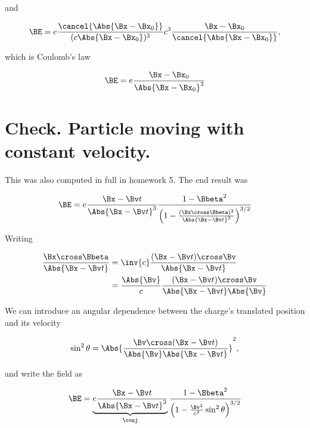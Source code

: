and

\begin{equation}\label{eqn:relativisticElectrodynamicsL19:140}
\BE = e \frac{\cancel{ \Abs{\Bx - \Bx_0}} }{ (c \Abs{\Bx - \Bx_0})^3 } c^3 \frac{\Bx - \Bx_0}{\cancel{\Abs{\Bx - \Bx_0}}},
\end{equation}

which is Coulomb's law

\begin{equation}\label{eqn:relativisticElectrodynamicsL19:160}
\BE = e \frac{\Bx - \Bx_0}{\Abs{\Bx - \Bx_0}^3}
\end{equation}

\section{Check.  Particle moving with constant velocity.}

This was also computed in full in homework 5.  The end result was

\begin{equation}\label{eqn:relativisticElectrodynamicsL19:180}
\BE =
e 
\frac{\Bx - \Bv t}{\Abs{\Bx - \Bv t}^3}
\frac{1 -\Bbeta^2}{ \left(1 - \frac{(\Bx \cross \Bbeta)^2}{\Abs{\Bx - \Bv t}^2} \right)^{3/2} }
\end{equation}

Writing

\begin{align*}
\frac{\Bx \cross \Bbeta}{\Abs{\Bx - \Bv t}}
&=
\inv{c} \frac{(\Bx - \Bv t) \cross \Bv}{\Abs{\Bx - \Bv t}}  \\
&=
\frac{\Abs{\Bv}}{c} \frac{(\Bx - \Bv t) \cross \Bv}{\Abs{\Bx - \Bv t} \Abs{\Bv}}  
\end{align*}

We can introduce an angular dependence between the charge's translated position and its velocity

\begin{equation}\label{eqn:relativisticElectrodynamicsL19:200}
\sin^2 \theta = \Abs{ \frac{\Bv \cross (\Bx - \Bv t)}{\Abs{\Bv} \Abs{\Bx - \Bv t}} }^2,
\end{equation}

and write the field as

\begin{equation}\label{eqn:relativisticElectrodynamicsL19:220}
\BE =
\underbrace{e 
\frac{\Bx - \Bv t}{\Abs{\Bx - \Bv t}^3}}_{\conj}
\frac{1 -\Bbeta^2}{ \left(1 - \frac{\Bv^2}{c^2} \sin^2 \theta \right)^{3/2} }
\end{equation}

